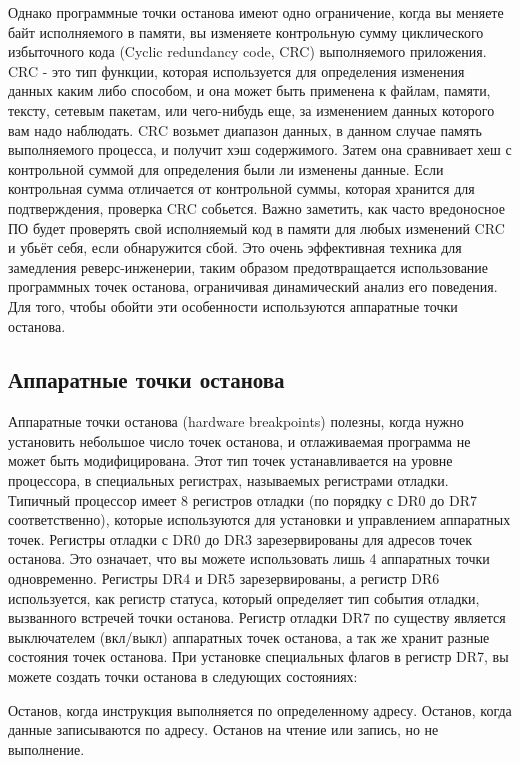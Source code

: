 \documentclass[12pt, a4paper, oneside]{book}
\begin{document}
Однако программные точки останова имеют одно ограничение, когда вы меняете байт исполняемого в памяти, вы изменяете контрольную сумму циклического избыточного кода (Cyclic redundancy code, CRC) выполняемого приложения. CRC - это тип функции, которая используется для определения изменения данных каким либо способом, и она может быть применена к файлам, памяти, тексту, сетевым пакетам, или чего-нибудь еще, за изменением данных которого вам надо наблюдать. CRC возьмет диапазон данных, в данном случае память выполняемого процесса, и получит хэш содержимого. Затем она сравнивает хеш с контрольной суммой для определения были ли изменены данные. Если контрольная сумма отличается от контрольной суммы, которая хранится для подтверждения, проверка CRC собьется. Важно заметить, как часто вредоносное ПО будет проверять свой исполняемый код в памяти для любых изменений CRC и убьёт себя, если обнаружится сбой. Это очень эффективная техника для замедления реверс-инженерии, таким образом предотвращается использование программных точек останова, ограничивая динамический анализ его поведения. Для того, чтобы обойти эти особенности используются аппаратные точки останова.\\

\subsection{Аппаратные точки останова}

Аппаратные точки останова (hardware breakpoints) полезны, когда нужно установить небольшое число точек останова, и отлаживаемая программа не может быть модифицирована. Этот тип точек устанавливается на уровне процессора, в специальных регистрах, называемых регистрами отладки. Типичный процессор имеет 8 регистров отладки (по порядку с DR0 до DR7 соответственно), которые используются для установки и управлением аппаратных точек. Регистры отладки с DR0 до DR3 зарезервированы для адресов точек останова. Это означает, что вы можете использовать лишь 4 аппаратных точки одновременно. Регистры DR4 и DR5 зарезервированы, а регистр DR6 используется, как регистр статуса, который определяет тип события отладки, вызванного встречей точки останова. Регистр отладки DR7 по существу является выключателем (вкл/выкл) аппаратных точек останова, а так же хранит разные состояния точек останова. При установке специальных флагов в регистр DR7, вы можете создать точки останова в следующих состояниях:

     Останов, когда инструкция выполняется по определенному адресу.
     Останов, когда данные записываются по адресу.
     Останов на чтение или запись, но не выполнение.
\end{document}
